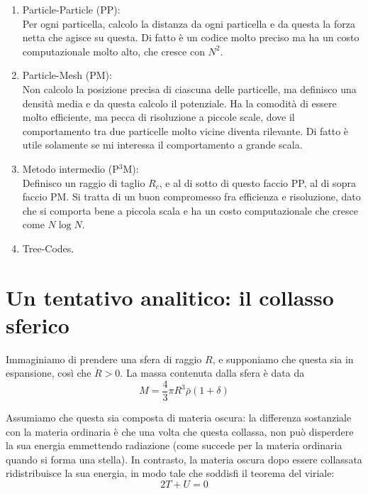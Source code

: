 \documentclass{report}
\begin{document}
    \begin{enumerate}
        \item Particle-Particle (PP): \\
        Per ogni particella, calcolo la distanza da ogni particella e da questa la forza netta che agisce su questa. Di fatto è un codice molto preciso ma ha un costo computazionale molto alto, che cresce con $N^2$. 
        \item Particle-Mesh (PM): \\
        Non calcolo la posizione precisa di ciascuna delle particelle, ma definisco una densità media e da questa calcolo il potenziale. Ha la comodità di essere molto efficiente, ma pecca di risoluzione a piccole scale, dove il comportamento tra due particelle molto vicine diventa rilevante. Di fatto è utile solamente se mi interessa il comportamento a grande scala. 
        \item Metodo intermedio (P$^3$M): \\ 
        Definisco un raggio di taglio $R_c$, e al di sotto di questo faccio PP, al di sopra faccio PM. Si tratta di un buon compromesso fra efficienza e risoluzione, dato che si comporta bene a piccola scala e ha un costo computazionale che cresce come $N\log N$. 
        \item Tree-Codes. 
    \end{enumerate}

\section{Un tentativo analitico: il collasso sferico}

Immaginiamo di prendere una sfera di raggio $R$, e supponiamo che questa sia in espansione, così che $\dot{R}>0$. La massa contenuta dalla sfera è data da 
\begin{equation}
    M = \frac{4}{3}\pi R^3 \bar{\rho}(1+\delta)
\end{equation}

Assumiamo che questa sia composta di materia oscura: la differenza sostanziale con la materia ordinaria è che una volta che questa collassa, non può disperdere la sua energia emmettendo radiazione (come succede per la materia ordinaria quando si forma una stella). In contrasto, la materia oscura dopo essere collassata ridistribuisce la sua energia, in modo tale che soddisfi il teorema del viriale: 
\begin{equation}
    2T + U = 0
\end{equation}
\end{document}
